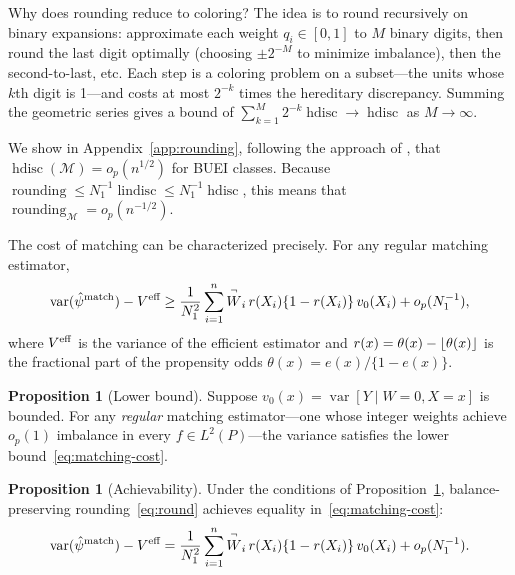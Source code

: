 \documentclass{article}
\theoremstyle{definition}
\newtheorem{proposition}[theorem]{Proposition}
\DeclareMathOperator{\Var}{var}
\DeclarePairedDelimiter\floor{\lfloor}{\rfloor}
\DeclareMathOperator{\roundingerror}{rounding}
\DeclareMathOperator{\hdisc}{hdisc}
\DeclareMathOperator{\lindisc}{lindisc}
\newcommand{\model}{\mathcal{M}}
\newcommand{\<}{\langle}
\renewcommand{\>}{\rangle}
\begin{document}
Why does rounding reduce to coloring? The idea is to round recursively on binary expansions: approximate each weight $q_i \in [0,1]$ to $M$ binary digits, then round the last digit optimally (choosing $\pm 2^{-M}$ to minimize imbalance), then the second-to-last, etc. Each step is a coloring problem on a subset---the units whose $k$th digit is 1---and costs at most $2^{-k}$ times the hereditary discrepancy. Summing the geometric series gives a bound of $\sum_{k=1}^M 2^{-k} \hdisc \to \hdisc$ as $M \to \infty$.

We show in Appendix~\ref{app:rounding}, following the approach of \citet{mendelson2011discrepancy}, that $\hdisc(\model) = o_p(n^{1/2})$ for BUEI classes. Because $\roundingerror \le N_1^{-1} \lindisc \le N_1^{-1} \hdisc$, this means that $\roundingerror_\model = o_p(n^{-1/2})$.

The cost of matching can be characterized precisely. For any regular matching estimator,
\begin{equation}
\label{eq:matching-cost}
\Var(\hat\psi^{\textup{match}}) - V^{\textup{eff}} \ge \frac{1}{N_1^2}\sum_{i=1}^n \overset{\neg}{W}_i\, r(X_i)\{1-r(X_i)\}\,v_0(X_i) + o_p(N_1^{-1}),
\end{equation}
where $V^{\textup{eff}}$ is the variance of the efficient estimator and $r(x) = \theta(x) - \floor{\theta(x)}$ is the fractional part of the propensity odds $\theta(x) = e(x)/\{1-e(x)\}$.

\begin{proposition}[Lower bound]
\label{prop:matching-cost}
Suppose $v_0(x) = \Var[Y \mid W=0, X=x]$ is bounded. For any \emph{regular} matching estimator---one whose integer weights achieve $o_p(1)$ imbalance in every $f \in L^2(P)$---the variance satisfies the lower bound~\eqref{eq:matching-cost}.
\end{proposition}

\begin{proposition}[Achievability]
\label{prop:matching-achievable}
Under the conditions of Proposition~\ref{prop:matching-cost}, balance-preserving rounding~\eqref{eq:round} achieves equality in~\eqref{eq:matching-cost}:
\[
\Var(\hat\psi^{\textup{match}}) - V^{\textup{eff}} = \frac{1}{N_1^2}\sum_{i=1}^n \overset{\neg}{W}_i\, r(X_i)\{1-r(X_i)\}\,v_0(X_i) + o_p(N_1^{-1}).
\]
\end{proposition}
\end{document}
